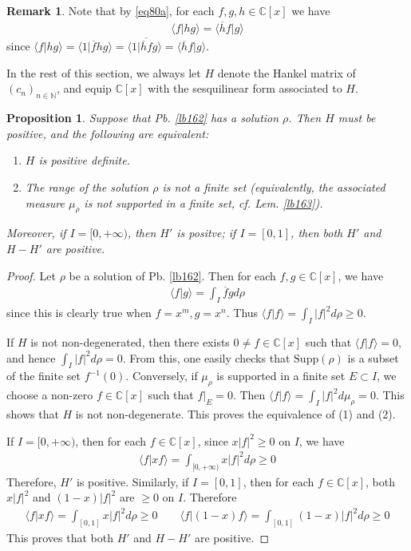 \documentclass[12pt,b5paper,notitlepage]{article}
\theoremstyle{definition}
\newtheorem{rem}[df]{Remark}
\theoremstyle{plain}
\newtheorem{pp}[df]{Proposition}
\newcommand{\ovl}{\overline}
\newcommand{\bk}[1]{\langle {#1}\rangle}
\newcommand{\bigbk}[1]{\big\langle {#1}\big\rangle}
\newcommand{\Cbb}{\mathbb C}
\newcommand{\Nbb}{\mathbb N}
\newcommand{\Supp}{\mathrm{Supp}}
\numberwithin{equation}{section}
\begin{document}
\begin{rem}\label{lb166}
Note that by \eqref{eq80a}, for each $f,g,h\in\Cbb[x]$ we have
\begin{align}
\bigbk{f\big|hg}=\bigbk{\ovl hf\big|g}
\end{align}
since $\bk{f|hg}=\bk{1|\ovl fhg}=\bk{1|\ovl{\ovl hf}g}=\bk{\ovl hf|g}$.
\end{rem}



In the rest of this section, we always let $H$ denote the Hankel matrix of $(c_n)_{n\in\Nbb}$, and equip $\Cbb[x]$ with the sesquilinear form associated to $H$.


\begin{pp}\label{lb168}
Suppose that Pb. \ref{lb162} has a solution $\rho$. Then $H$ must be positive, and the following are equivalent:
\begin{enumerate}[label=(\arabic*)]
\item $H$ is positive definite.
\item The range of the solution $\rho$ is not a finite set (equivalently, the associated measure $\mu_\rho$ is not supported in a finite set, cf. Lem. \ref{lb163}).
\end{enumerate}
Moreover, if $I=[0,+\infty)$, then $H'$ is positve; if $I=[0,1]$, then both $H'$ and $H-H'$ are positive.
\end{pp}


\begin{proof}
Let $\rho$ be a solution of Pb. \ref{lb162}. Then for each $f,g\in\Cbb[x]$, we have
\begin{align}\label{eq101}
\bk{f|g}= \int_I \ovl f gd\rho
\end{align}
since this is clearly true when $f=x^m,g=x^n$. Thus $\bk{f|f}=\int_I |f|^2d\rho\geq0$. 

If $H$ is not non-degenerated, then there exists $0\neq f\in\Cbb[x]$ such that $\bk{f|f}=0$, and hence $\int_I|f|^2d\rho=0$. From this, one easily checks that $\Supp(\rho)$ is a subset of the finite set $f^{-1}(0)$. Conversely, if $\mu_\rho$ is supported in a finite set $E\subset I$, we choose a non-zero $f\in\Cbb[x]$ such that $f|_E=0$. Then $\bk{f|f}=\int_I|f|^2d\mu_\rho=0$. This shows that $H$ is not non-degenerate. This proves the equivalence of (1) and (2).

If $I=[0,+\infty)$, then for each $f\in\Cbb[x]$, since $x|f|^2\geq0$ on $I$, we have
\begin{align*}
\bk{f|xf}=\int_{[0,+\infty)}x|f|^2d\rho\geq0
\end{align*}
Therefore, $H'$ is positive. Similarly, if $I=[0,1]$, then for each $f\in\Cbb[x]$, both $x|f|^2$ and $(1-x)|f|^2$ are $\geq0$ on $I$. Therefore
\begin{align*}
\bk{f|xf}=\int_{[0,1]}x|f|^2d\rho\geq0\qquad  \bk{f|(1-x)f}=\int_{[0,1]}(1-x)|f|^2d\rho\geq0
\end{align*}
This proves that both $H'$ and $H-H'$ are positive. 
\end{proof}
\end{document}
